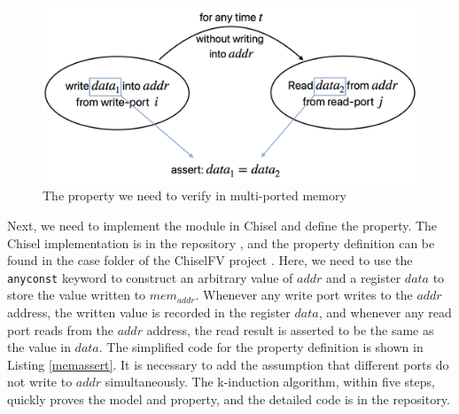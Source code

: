 \documentclass[conference]{IEEEtran}
\theoremstyle{definition}
\begin{document}
\begin{figure}[!htbp]
    \begin{center}
    \includegraphics[width=1\linewidth]{pics/memverify.png}
    \caption{The property we need to verify in multi-ported memory}
    \label{fig: memverify}
    \end{center}
\end{figure}

Next, we need to implement the module in Chisel and define the property. 
The Chisel implementation is in the repository \cite{mpMemory}, and the property definition can be found in the case folder of the ChiselFV project \cite{ChiselFV}.
Here, we need to use the \verb|anyconst| keyword to construct an arbitrary value of $addr$ and a register $data$ to store the value written to $mem_{addr}$. Whenever any write port writes to the $addr$ address, the written value is recorded in the register $data$, and whenever any read port reads from the $addr$ address, the read result is asserted to be the same as the value in $data$.
The simplified code for the property definition is shown in Listing \ref{memassert}. It is necessary to add the assumption that different ports do not write to $addr$ simultaneously.
The k-induction algorithm, within five steps, quickly proves the model and property, and the detailed code is in the repository.
\end{document}
